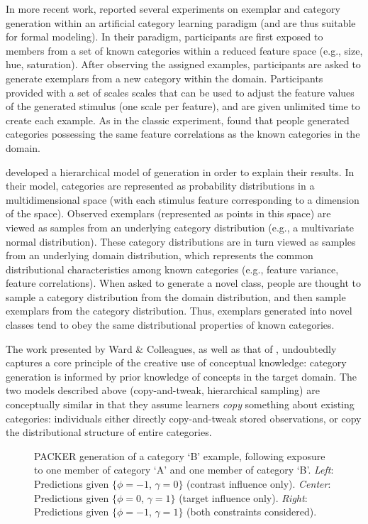 \documentclass[10pt,letterpaper]{article}
\newcommand\inputpgf[2]{{
\let\pgfimageWithoutPath\pgfimage
\renewcommand{\pgfimage}[2][]{\pgfimageWithoutPath[##1]{#1/##2}}

}}
\begin{document}
In more recent work, \citet{jern2013probabilistic} reported several experiments on exemplar and category generation within an artificial category learning paradigm (and are thus suitable for formal modeling). In their paradigm, participants are first exposed to members from a set of known categories within a reduced feature space (e.g., size, hue, saturation). After observing the assigned examples, participants are asked to generate exemplars from a new category within the domain. Participants provided with a set of scales scales that can be used to adjust the feature values of the generated stimulus (one scale per feature), and are given unlimited time to create each example. As in the classic \cite{ward1994structured} experiment, \citet{jern2013probabilistic} found that people generated categories possessing the same feature correlations as the known categories in the domain.

\citet{jern2013probabilistic} developed a hierarchical model of generation in order to explain their results. In their model, categories are represented as probability distributions in a multidimensional space (with each stimulus feature corresponding to a dimension of the space). Observed exemplars (represented as points in this space) are viewed as samples from an underlying category distribution (e.g., a multivariate normal distribution). These category distributions are in turn viewed as samples from an underlying domain distribution, which represents the common distributional characteristics among known categories (e.g., feature variance, feature correlations). When asked to generate a novel class, people are thought to sample a category distribution from the domain distribution, and then sample exemplars from the category distribution. Thus, exemplars generated into novel classes tend to obey the same distributional properties of known categories. 

The work presented by Ward \& Colleagues, as well as that of \citet{jern2013probabilistic}, undoubtedly captures a core principle of the creative use of conceptual knowledge: category generation is informed by prior knowledge of concepts in the target domain. The two models described above (copy-and-tweak, hierarchical sampling) are conceptually similar in that they assume learners \textit{copy} something about existing categories: individuals either directly copy-and-tweak stored observations, or copy the distributional structure of entire categories.

\begin{figure*}
    \begin{center}
    \inputpgf{figs/}{example-prob-spaces.pgf}
    \caption{PACKER generation of a category `B' example, following exposure to one member of category `A' and one member of category `B'. \textit{Left}: Predictions given $\{\phi = -1$, $\gamma = 0\}$ (contrast influence only). \textit{Center}: Predictions given $\{\phi = 0$, $\gamma = 1\}$ (target influence only).  \textit{Right}: Predictions given $\{\phi = -1$, $\gamma = 1\}$ (both constraints considered).  }
    \label{fig:example-prob-spaces}
    \end{center}
\end{figure*}
\end{document}
